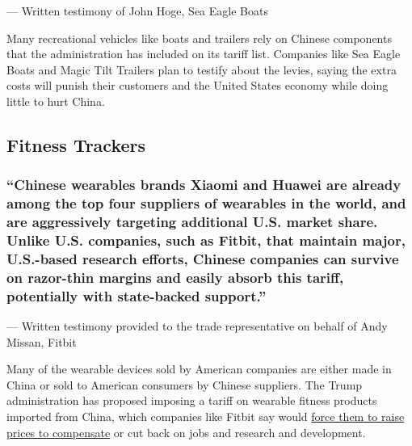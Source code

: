 --- Written testimony of John Hoge, Sea Eagle Boats

Many recreational vehicles like boats and trailers rely on Chinese
components that the administration has included on its tariff list.
Companies like Sea Eagle Boats and Magic Tilt Trailers plan to testify
about the levies, saying the extra costs will punish their customers and
the United States economy while doing little to hurt China.

\hypertarget{fitness-trackers}{%
\subsection{Fitness Trackers}\label{fitness-trackers}}

\hypertarget{chinese-wearables-brands-xiaomi-and-huawei-are-already-among-the-top-four-suppliers-of-wearables-in-the-world-and-are-aggressively-targeting-additional-us-market-share-unlike-us-companies-such-as-fitbit-that-maintain-major-us-based-research-efforts-chinese-companies-can-survive-on-razor-thin-margins-and-easily-absorb-this-tariff-potentially-with-state-backed-support}{%
\subsubsection{``Chinese wearables brands Xiaomi and Huawei are already
among the top four suppliers of wearables in the world, and are
aggressively targeting additional U.S. market share. Unlike U.S.
companies, such as Fitbit, that maintain major, U.S.-based research
efforts, Chinese companies can survive on razor-thin margins and easily
absorb this tariff, potentially with state-backed
support.''}\label{chinese-wearables-brands-xiaomi-and-huawei-are-already-among-the-top-four-suppliers-of-wearables-in-the-world-and-are-aggressively-targeting-additional-us-market-share-unlike-us-companies-such-as-fitbit-that-maintain-major-us-based-research-efforts-chinese-companies-can-survive-on-razor-thin-margins-and-easily-absorb-this-tariff-potentially-with-state-backed-support}}

--- Written testimony provided to the trade representative on behalf of
Andy Missan, Fitbit

Many of the wearable devices sold by American companies are either made
in China or sold to American consumers by Chinese suppliers. The Trump
administration has proposed imposing a tariff on wearable fitness
products imported from China, which companies like Fitbit say would
\href{http://d18rn0p25nwr6d.cloudfront.net/CIK-0001447599/6d91d32a-f428-4ba5-bac6-a837bfe13a95.pdf}{force
them to raise prices to compensate} or cut back on jobs and research and
development.

